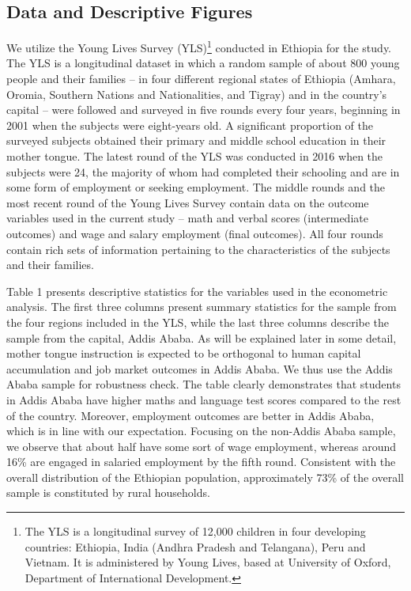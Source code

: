 \subsection*{Data and Descriptive Figures}

We utilize the Young Lives Survey (YLS)\footnote{The YLS is a longitudinal survey of 12,000 children in four developing countries: Ethiopia, India (Andhra Pradesh and Telangana), Peru and Vietnam. It is administered by Young Lives, based at University of Oxford, Department of International Development.} conducted in Ethiopia for the study. The YLS is a longitudinal dataset in which a random sample of about 800 young people and their families – in four different regional states of Ethiopia (Amhara, Oromia, Southern Nations and Nationalities, and Tigray) and in the country’s capital – were followed and surveyed in five rounds every four years, beginning in 2001 when the subjects were eight-years old. A significant proportion of the surveyed subjects obtained their primary and middle school education in their mother tongue. The latest round of the YLS was conducted in 2016 when the subjects were 24, the majority of whom had completed their schooling and are in some form of employment or seeking employment. The middle rounds and the most recent round of the Young Lives Survey contain data on the outcome variables used in the current study – math and verbal scores (intermediate outcomes) and wage and salary employment (final outcomes). All four rounds contain rich sets of information pertaining to the characteristics of the subjects and their families.

Table 1 presents descriptive statistics for the variables used in the econometric analysis. The first three columns present summary statistics for the sample from the four regions included in the YLS, while the last three columns describe the sample from the capital, Addis Ababa. As will be explained later in some detail, mother tongue instruction is expected to be orthogonal to human capital accumulation and job market outcomes in Addis Ababa. We thus use the Addis Ababa sample for robustness check. The table clearly demonstrates that students in Addis Ababa have higher maths and language test scores compared to the rest of the country. Moreover, employment outcomes are better in Addis Ababa, which is in line with our expectation. Focusing on the non-Addis Ababa sample, we observe that about half have some sort of wage employment, whereas around 16\% are engaged in salaried employment by the fifth round. Consistent with the overall distribution of the Ethiopian population, approximately 73\% of the overall sample is constituted by rural households.

